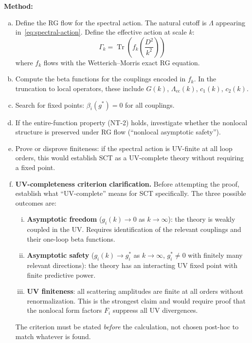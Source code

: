 \documentclass[12pt,a4paper]{article}
\newcommand{\Tr}{\operatorname{Tr}}
\newcommand{\Lam}{\Lambda}
\newcommand{\method}[1]{\noindent\textbf{Method:} #1\par}
\begin{document}
\method{
\begin{enumerate}[(a)]
  \item Define the RG flow for the spectral action. The natural cutoff is $\Lam$
    appearing in~\eqref{eq:spectral-action}. Define the effective action at scale $k$:
    \begin{equation}
      \Gamma_k = \Tr\!\left(f_k\!\left(\frac{D^2}{k^2}\right)\right)
    \end{equation}
    where $f_k$ flows with the Wetterich--Morris exact RG equation.
  \item Compute the beta functions for the couplings encoded in $f_k$.
    In the truncation to local operators, these include $G(k)$, $\Lam_{\text{cc}}(k)$,
    $c_1(k)$, $c_2(k)$.
  \item Search for fixed points: $\beta_i(g^*) = 0$ for all couplings.
  \item If the entire-function property (NT-2) holds, investigate whether the
    nonlocal structure is preserved under RG flow (``nonlocal asymptotic safety'').
  \item Prove or disprove finiteness: if the spectral action is UV-finite at
    all loop orders, this would establish SCT as a UV-complete theory without
    requiring a fixed point.
  \item \textbf{UV-completeness criterion clarification.}
    Before attempting the proof, establish what ``UV-complete'' means for SCT
    specifically. The three possible outcomes are:
    \begin{enumerate}[(i)]
      \item \textbf{Asymptotic freedom} ($g_i(k) \to 0$ as $k \to \infty$):
        the theory is weakly coupled in the UV. Requires identification of
        the relevant couplings and their one-loop beta functions.
      \item \textbf{Asymptotic safety} ($g_i(k) \to g_i^*$ as $k \to \infty$,
        $g_i^* \neq 0$ with finitely many relevant directions): the theory
        has an interacting UV fixed point with finite predictive power.
      \item \textbf{UV finiteness}: all scattering amplitudes are finite at
        all orders without renormalization. This is the strongest claim and
        would require proof that the nonlocal form factors $F_i$ suppress
        all UV divergences.
    \end{enumerate}
    The criterion must be stated \emph{before} the calculation, not chosen
    post-hoc to match whatever is found.
\end{enumerate}
}
\end{document}
